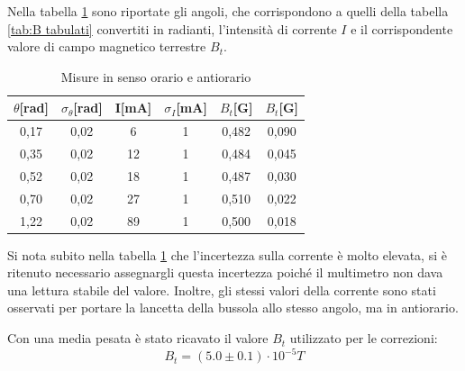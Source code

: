 \documentclass{article}
\begin{document}
Nella tabella \ref{tab:orario e antiorario} sono riportate gli angoli, che corrispondono a quelli della tabella \ref{tab:B tabulati} convertiti in radianti, l'intensità di corrente $I$ e il corrispondente valore di campo magnetico terrestre $B_t$. 
        \begin{table}[h]
        \centering
        \begin{tabular}{ c c c c c c}
            \toprule
            $\theta$[rad] & $\sigma_\theta$[rad] & I[mA] & $\sigma_I$[mA] & $B_t$[G] & $B_t$[G] \\
            \midrule
            0,17 & 0,02 & 6 & 1 & 0,482 & 0,090 \\ 
            0,35 & 0,02 & 12 & 1 & 0,484 & 0,045 \\ 
            0,52 & 0,02 & 18 & 1 & 0,487 & 0,030 \\ 
            0,70 & 0,02 & 27 & 1 & 0,510 & 0,022 \\ 
            1,22 & 0,02 & 89 & 1 & 0,500 & 0,018 \\ 
            \bottomrule
        \end{tabular}
        \caption{Misure in senso orario e antiorario}
        \label{tab:orario e antiorario}
    \end{table}

    Si nota subito nella tabella \ref{tab:orario e antiorario} che l'incertezza sulla corrente è molto elevata, si è ritenuto necessario assegnargli questa incertezza poiché il multimetro non dava una lettura stabile del valore.
    Inoltre, gli stessi valori della corrente sono stati osservati per portare la lancetta della bussola allo stesso angolo, ma in antiorario.

    Con una media pesata è stato ricavato il valore $B_t$ utilizzato per le correzioni:
    \[B_t = (5.0\pm 0.1)\cdot10^{-5}T\]
    
\end{document}
